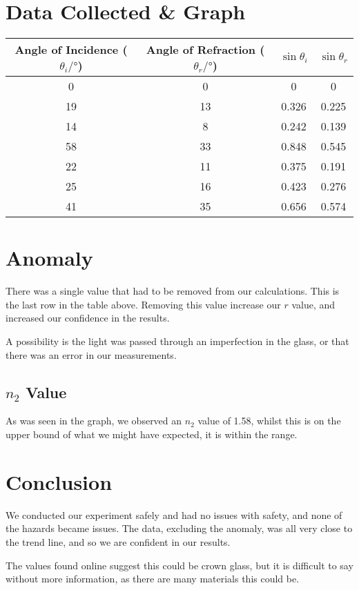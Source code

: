 \documentclass{article}
\begin{document}
\newpage

\section{Data Collected \& Graph}

\begin{table}[H]
    \centering
    \begin{tabular}{|c|c|c|c|}
        \hline 
        Angle of Incidence ($\theta_i/\si{\degree} $) & Angle of Refraction ($\theta_r/\si{\degree} $) & $\sin{\theta_i}$ & $\sin{\theta_r}$ \\
        \hline
        0 & 0 & 0 & 0 \\
        19 & 13 & 0.326 & 0.225 \\
        14 & 8 & 0.242 & 0.139 \\
        58 & 33 & 0.848 & 0.545 \\
        22 & 11 & 0.375 & 0.191 \\
        25 & 16 & 0.423 & 0.276 \\
        41 & 35 & 0.656 & 0.574\\

        \hline
    \end{tabular}
\end{table}

\begin{figure}[H]
    \centering
    \label{fig:my_label}
\end{figure}





\section{Anomaly}
There was a single value that had to be removed from our calculations. This is the last row in the table above. Removing this value increase our $r$ value, and increased our confidence in the results.

A possibility is the light was passed through an imperfection in the glass, or that there was an error in our measurements.

\subsection{$n_2$ Value}
As was seen in the graph, we observed an $n_2$ value of 1.58, whilst this is on the upper bound of what we might have expected, it is within the range.


\section{Conclusion}
We conducted our experiment safely and had no issues with safety, and none of the hazards became issues. The data, excluding the anomaly, was all very close to the trend line, and so we are confident in our results.

The values found online suggest this could be crown glass, but it is difficult to say without more information, as there are many materials this could be.
\end{document}
